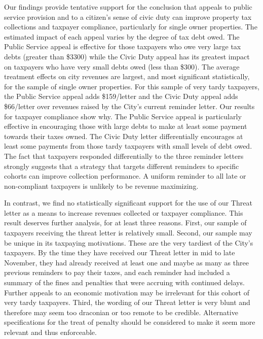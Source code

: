 \documentclass[12pt,titlepage]{article}
\begin{document}
Our findings provide tentative support for the conclusion that 
appeals to public service provision and to a citizen’s sense of 
civic duty can improve property tax collections and taxpayer 
compliance, particularly for single owner properties.  The estimated 
impact of each appeal varies by the degree of tax debt owed.  
The Public Service appeal is effective for those taxpayers who owe 
very large tax debts (greater than \$3300) while the Civic Duty 
appeal has its greatest impact on taxpayers who have very small 
debts owed (less than \$300).   The average treatment effects on 
city revenues are largest, and most significant statistically, 
for the sample of single owner properties.  For this sample of very 
tardy taxpayers, the Public Service appeal adds \$159/letter and 
the Civic Duty appeal adds \$66/letter over revenues raised by the 
City’s current reminder letter.  Our results for taxpayer compliance 
show why.  The Public Service appeal is particularly effective in 
encouraging those with large debts to make at least some payment 
towards their taxes owned.   The Civic Duty letter differentially 
encourages at least some payments from those tardy taxpayers with 
small levels of debt owed.  The fact that taxpayers responded 
differentially to the three reminder letters strongly suggests 
that a strategy that targets different reminders to specific 
cohorts can improve collection performance.  A uniform reminder 
to all late or non-compliant taxpayers is unlikely to be revenue maximizing.
	
In contrast, we find no statistically significant support for the 
use of our Threat letter as a means to increase revenues collected 
or taxpayer compliance.   This result deserves further analysis, 
for at least three reasons.   First, our sample of taxpayers 
receiving the threat letter is relatively small.  Second, our sample 
may be unique in its taxpaying motivations.   These are the very 
tardiest of the City’s taxpayers.   By the time they have received 
our Threat letter in mid to late November, they had already received 
at least one and maybe as many as three previous reminders to pay 
their taxes, and each reminder had included a summary of the fines 
and penalties that were accruing with continued delays.  Further 
appeals to an economic motivation may be irrelevant for this cohort 
of very tardy taxpayers.  Third, the wording of our Threat letter 
is very blunt and therefore may seem too draconian or too remote to 
be credible.   Alternative specifications for the treat of penalty 
should be considered to make it seem more relevant and thus enforceable.  
	
\end{document}

